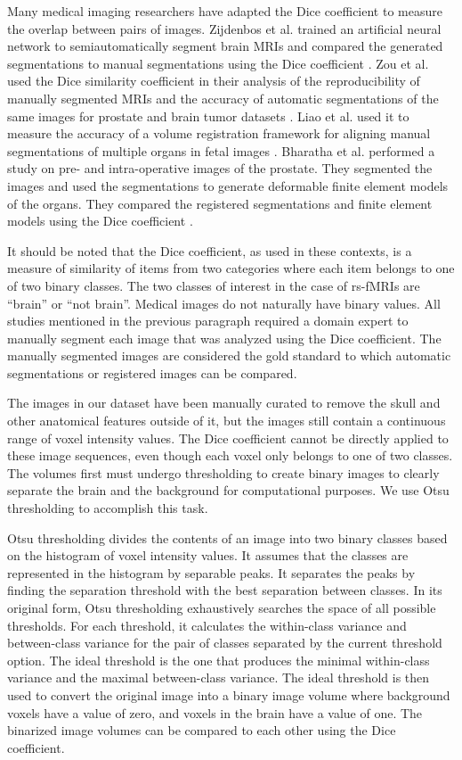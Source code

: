 Many medical imaging researchers have adapted the Dice coefficient to measure the overlap between pairs of images. 
Zijdenbos et al. trained an artificial neural network to semiautomatically segment brain MRIs and compared the generated segmentations to manual segmentations using the Dice coefficient \cite{Zijdenbos1994}.
Zou et al. used the Dice similarity coefficient in their analysis of the reproducibility of manually segmented MRIs and the accuracy of automatic segmentations of the same images for prostate and brain tumor datasets \cite{Zou2004}. 
Liao et al. used it to measure the accuracy of a volume registration framework for aligning manual segmentations of multiple organs in fetal images \cite{Liao2016}. Bharatha et al. performed a study on pre- and intra-operative images of the prostate. They segmented the images and used the segmentations to generate deformable finite element models of the organs. They compared the registered segmentations and finite element models using the Dice coefficient \cite{Bharatha2001}.

It should be noted that the Dice coefficient, as used in these contexts, is a measure of similarity of items from two categories where each item belongs to one of two binary classes. The two classes of interest in the case of rs-fMRIs are ``brain'' or ``not brain''. Medical images do not naturally have binary values. All studies mentioned in the previous paragraph required a domain expert to manually segment each image that was analyzed using the Dice coefficient. The manually segmented images are considered the gold standard to which automatic segmentations or registered images can be compared. 

The images in our dataset have been manually curated to remove the skull and other anatomical features outside of it, but the images still contain a continuous range of voxel intensity values. The Dice coefficient cannot be directly applied to these image sequences, even though each voxel only belongs to one of two classes. The volumes first must undergo thresholding to create binary images to clearly separate the brain and the background for computational purposes. We use Otsu thresholding to accomplish this task. 

Otsu thresholding divides the contents of an image into two binary classes based on the histogram of voxel intensity values. It assumes that the classes are represented in the histogram by separable peaks. It separates the peaks by finding the separation threshold with the best separation between classes. In its original form, Otsu thresholding exhaustively searches the space of all possible thresholds. For each threshold, it calculates the within-class variance and between-class variance for the pair of classes separated by the current threshold option. The ideal threshold is the one that produces the minimal within-class variance and the maximal between-class variance. The ideal threshold is then used to convert the original image into a binary image volume where background voxels have a value of zero, and voxels in the brain have a value of one. The binarized image volumes can be compared to each other using the Dice coefficient. 

